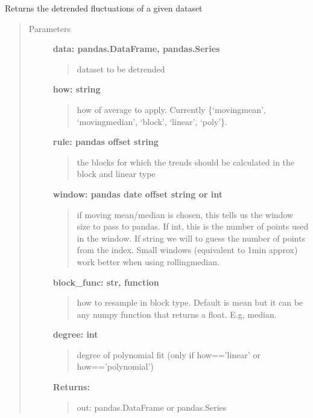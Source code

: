 \documentclass[a4paper,10pt,english]{sphinxmanual}
\begin{document}
\begin{fulllineitems}
\label{pymicra:pymicra.data.detrend}
Returns the detrended fluctuations of a given dataset
\begin{quote}\begin{description}
\item[{Parameters}] \leavevmode
\textbf{data: pandas.DataFrame, pandas.Series}
\begin{quote}

dataset to be detrended
\end{quote}

\textbf{how: string}
\begin{quote}

how of average to apply. Currently \{`movingmean', `movingmedian', `block', `linear', `poly'\}.
\end{quote}

\textbf{rule: pandas offset string}
\begin{quote}

the blocks for which the trends should be calculated in the block and linear type
\end{quote}

\textbf{window: pandas date offset string or int}
\begin{quote}

if moving mean/median is chosen, this tells us the window size to pass to pandas. If int,
this is the number of points used in the window. If string we will to guess the number of
points from the index.
Small windows (equivalent to 1min approx) work better when using rollingmedian.
\end{quote}

\textbf{block\_func: str, function}
\begin{quote}

how to resample in block type. Default is mean but it can be any numpy function
that returns a float. E.g, median.
\end{quote}

\textbf{degree: int}
\begin{quote}

degree of polynomial fit (only if how=='linear' or how=='polynomial')
\end{quote}

\textbf{Returns:}
\begin{quote}

out: pandas.DataFrame or pandas.Series
\end{quote}

\end{description}\end{quote}

\end{fulllineitems}
\end{document}
